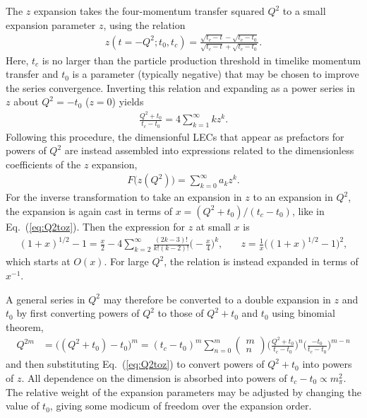 The $z$ expansion takes the four-momentum transfer squared $Q^2$
 to a small expansion parameter $z$, using the relation
\begin{align}
 z(t=-Q^2;t_0,t_c) = \frac{\sqrt{t_c-t} -\sqrt{t_c-t_0}}{ \sqrt{t_c-t} +\sqrt{t_c-t_0}}.
\end{align}
Here, $t_c$ is no larger than the particle production threshold in timelike momentum transfer
 and $t_0$ is a parameter (typically negative) that
 may be chosen to improve the series convergence.
Inverting this relation and expanding as a power series in $z$ about $Q^2=-t_0$ ($z=0$) yields
\begin{align}
 \frac{Q^2+t_0}{t_c-t_0} = 4 \sum_{k=1}^\infty k z^k.
 \label{eq:Q2toz}
\end{align}
Following this procedure, the dimensionful LECs that appear as prefactors for powers of $Q^2$
 are instead assembled into expressions related to the dimensionless
 coefficients of the $z$ expansion,
\begin{align}
 F\big(z(Q^2)\big) = \sum_{k=0}^\infty a_k z^k.
 \label{eq:zexp}
\end{align}
%
For the inverse transformation to take an expansion in $z$ to an expansion in $Q^2$,
 the expansion is again cast in terms of $x=(Q^2+t_0)/(t_c-t_0)$, like in Eq.~(\ref{eq:Q2toz}).
Then the expression for $z$ at small $x$ is
\begin{align}
 (1+x)^{1/2} -1 = \frac{x}{2}
 -4\sum_{k=2}^\infty \frac{(2k-3)!}{k!(k-2)!} \biggr( -\frac{x}{4} \biggr)^{k},
 &\quad
 z = \frac{1}{x} \big( (1+x)^{1/2} -1 \big)^2,
 \label{eq:ztoQ2}
\end{align}
 which starts at $O(x)$.
For large $Q^2$, the relation is instead expanded in terms of $x^{-1}$.

A general series in $Q^2$ may therefore be converted to a double expansion in $z$ and $t_0$
 by first converting powers of $Q^2$ to those of $Q^2+t_0$ and $t_0$ using binomial theorem,
\begin{align}
 Q^{2m} &= \big( (Q^2+t_0) -t_0 \big)^m
 = (t_c-t_0)^m
 \sum_{n=0}^{m} \left( \begin{array}{c} m \\ n \end{array} \right)
 \biggr( \frac{Q^2+t_0}{t_c-t_0} \biggr)^n \biggr( \frac{-t_0}{t_c-t_0} \biggr)^{m-n}
\end{align}
 and then substituting Eq.~(\ref{eq:Q2toz}) to convert powers of $Q^2+t_0$
 into powers of $z$.
All dependence on the dimension is absorbed into powers of $t_c-t_0 \propto m_\pi^2$.
The relative weight of the expansion parameters may be adjusted by changing
 the value of $t_0$, giving some modicum of freedom over the expansion order.

